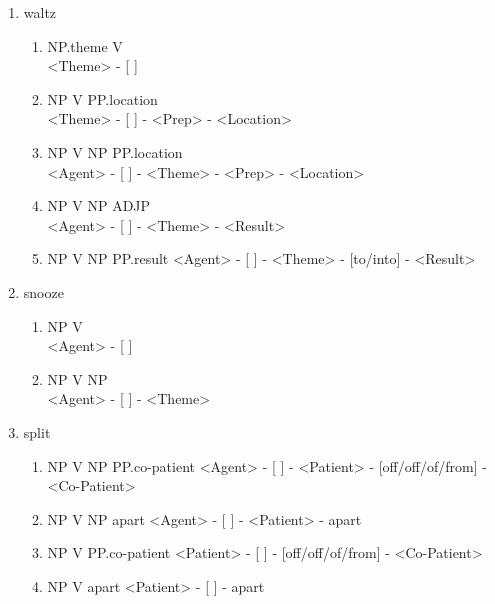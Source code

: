 \documentclass[11pt,a4paper,twocolumn]{article}
\begin{document}
\begin{enumerate}
\begin{enumerate}
				\end{enumerate}
				
			\item waltz
				\begin{enumerate}
					\item NP.theme V\\
					<Theme> - [ ]
					
					\item NP V PP.location\\
					<Theme> - [ ] - <Prep> - <Location>
					
					\item NP V NP PP.location\\
					<Agent> - [ ] - <Theme> - <Prep> - <Location>
					
					\item NP V NP ADJP\\
					<Agent> - [ ] - <Theme> - <Result>
					
					\item NP V NP PP.result
					<Agent> - [ ] - <Theme> - [to/into] - <Result>
				
				\end{enumerate}

			\item snooze
				\begin{enumerate}
					\item NP V\\
					<Agent> - [ ]
					
					\item NP V NP\\
					<Agent> - [ ] - <Theme>
					 
				\end{enumerate}		
				
			\item split
				\begin{enumerate}
					\item NP V NP PP.co-patient
					<Agent> - [ ] - <Patient> - [off/off/of/from] - <Co-Patient>
					
					\item NP V NP apart
					<Agent> - [ ] - <Patient> - apart
					
					\item NP V PP.co-patient
					<Patient> - [ ] - [off/off/of/from] - <Co-Patient>
					
					\item NP V apart
					<Patient> - [ ] - apart
					
				\end{enumerate}								
				

\end{enumerate}
\end{document}
